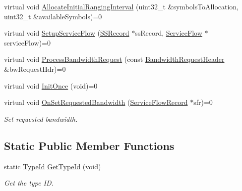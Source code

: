 \begin{DoxyCompactItemize}
\item 
virtual void \hyperlink{classns3_1_1UplinkScheduler_ae6094447ffd6d3946a70723246faed42}{Allocate\+Initial\+Ranging\+Interval} (uint32\+\_\+t \&symbols\+To\+Allocation, uint32\+\_\+t \&available\+Symbols)=0
\item 
virtual void \hyperlink{classns3_1_1UplinkScheduler_a101bce0939ff2315db3d2e3b75b4fed6}{Setup\+Service\+Flow} (\hyperlink{classns3_1_1SSRecord}{S\+S\+Record} $\ast$ss\+Record, \hyperlink{classns3_1_1ServiceFlow}{Service\+Flow} $\ast$service\+Flow)=0
\item 
virtual void \hyperlink{classns3_1_1UplinkScheduler_afca8bc8fcb079d7ee97c1d1f14a0ee2f}{Process\+Bandwidth\+Request} (const \hyperlink{classns3_1_1BandwidthRequestHeader}{Bandwidth\+Request\+Header} \&bw\+Request\+Hdr)=0
\item 
virtual void \hyperlink{classns3_1_1UplinkScheduler_ae427e6144919f70a361c047ddcfd5c4c}{Init\+Once} (void)=0
\item 
virtual void \hyperlink{classns3_1_1UplinkScheduler_a7bd17c3434380b9a57f8dcae6f4f289c}{On\+Set\+Requested\+Bandwidth} (\hyperlink{classns3_1_1ServiceFlowRecord}{Service\+Flow\+Record} $\ast$sfr)=0
\begin{DoxyCompactList}\small\item\em Set requested bandwidth. \end{DoxyCompactList}\end{DoxyCompactItemize}
\subsection*{Static Public Member Functions}
\begin{DoxyCompactItemize}
\item 
static \hyperlink{classns3_1_1TypeId}{Type\+Id} \hyperlink{classns3_1_1UplinkScheduler_a8e7e073bab177e3c946cfc68dfc174b6}{Get\+Type\+Id} (void)
\begin{DoxyCompactList}\small\item\em Get the type ID. \end{DoxyCompactList}\end{DoxyCompactItemize}
